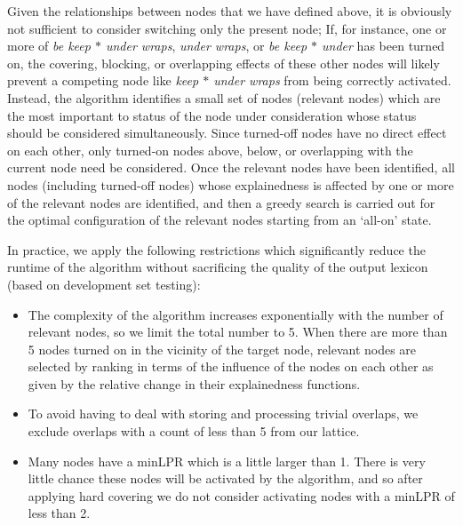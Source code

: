 \documentclass[11pt,letterpaper]{article}
\newcommand{\gap}{$*$\xspace}
\newcommand{\ex}[1]{\textit{#1}\xspace}
\begin{document}
Given the relationships between nodes that we have defined above, it is obviously not sufficient to consider switching only the present node; If, for instance, one or more of \ex{be keep \gap under wraps}, \ex{under wraps}, or \ex{be keep \gap under} has been turned on, the covering, blocking, or overlapping effects of these other nodes will likely prevent a competing node like \ex{keep \gap under wraps} from being correctly activated. Instead, the algorithm identifies a small set of nodes (relevant nodes) which are the most important to status of the node under consideration whose status should be considered simultaneously. Since turned-off nodes have no direct effect on each other, only turned-on nodes above, below, or overlapping with the current node need be considered.  Once the relevant nodes have been identified, all nodes (including turned-off nodes) whose explainedness is affected by one or more of the relevant nodes are identified, and then a greedy search is carried out for the optimal configuration of the relevant nodes starting from an `all-on' state. 

In practice, we apply the following restrictions which significantly reduce the runtime of the algorithm without sacrificing the quality of the output lexicon (based on development set testing):

\begin{itemize}
\item The complexity of the algorithm increases exponentially with the number of relevant nodes, so we limit the total number to 5. When there are more than 5 nodes turned on in the vicinity of the target node, relevant nodes are selected by ranking in terms of the influence of the nodes on each other as given by the relative change in their explainedness functions.
\item To avoid having to deal with storing and processing trivial overlaps, we exclude overlaps with a count of less than 5 from our lattice.
\item Many nodes have a minLPR which is a little larger than 1. There is very little chance these nodes will be activated by the algorithm, and so after applying hard covering we do not consider activating nodes with a minLPR of less than 2.
\end{itemize}
\end{document}
